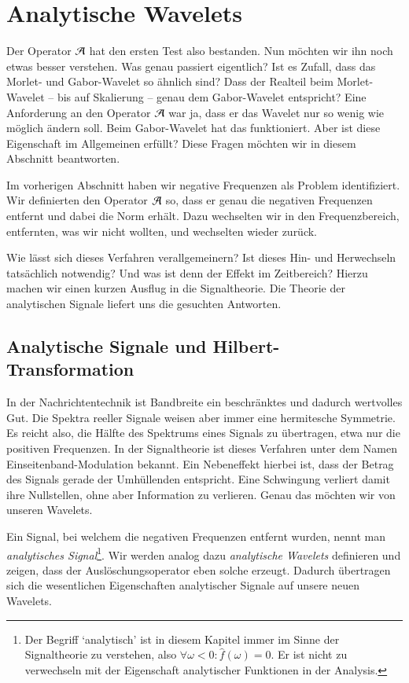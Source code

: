 \section{Analytische Wavelets}
Der Operator $\Ana\,$ hat den ersten Test also bestanden.
Nun möchten wir ihn noch etwas besser verstehen.
Was genau passiert eigentlich?
Ist es Zufall, dass das Morlet- und Gabor-Wavelet so ähnlich sind?
Dass der Realteil beim Morlet-Wavelet -- bis auf Skalierung -- genau dem Gabor-Wavelet entspricht?
Eine Anforderung an den Operator $\Ana\,$ war ja, dass er das Wavelet nur so wenig wie möglich ändern soll.
Beim Gabor-Wavelet hat das funktioniert.
Aber ist diese Eigenschaft im Allgemeinen erfüllt?
Diese Fragen möchten wir in diesem Abschnitt beantworten.

Im vorherigen Abschnitt haben wir negative Frequenzen als Problem identifiziert.
Wir definierten den Operator $\Ana\,$ so, dass er genau die negativen Frequenzen entfernt und dabei die Norm erhält.
Dazu wechselten wir in den Frequenzbereich, entfernten, was wir nicht wollten, und wechselten wieder zurück.

Wie lässt sich dieses Verfahren verallgemeinern? 
Ist dieses Hin- und Herwechseln tatsächlich notwendig?
Und was ist denn der Effekt im Zeitbereich?
Hierzu machen wir einen kurzen Ausflug in die Signaltheorie.
Die Theorie der analytischen Signale liefert uns die gesuchten Antworten.


\subsection{Analytische Signale und Hilbert-Transformation}
In der Nachrichtentechnik ist Bandbreite ein beschränktes und dadurch wertvolles Gut.
Die Spektra reeller Signale weisen aber immer eine hermitesche Symmetrie.
Es reicht also, die Hälfte des Spektrums eines Signals zu übertragen, etwa nur die positiven Frequenzen.
In der Signaltheorie ist dieses Verfahren unter dem Namen Einseitenband-Modulation bekannt.
Ein Nebeneffekt hierbei ist, dass der Betrag des Signals gerade der Umhüllenden entspricht.
Eine Schwingung verliert damit ihre Nullstellen, ohne aber Information zu verlieren.
Genau das möchten wir von unseren Wavelets.

Ein Signal, bei welchem die negativen Frequenzen entfernt wurden, nennt man \emph{analytisches Signal}\footnote{
	Der Begriff `analytisch' ist in diesem Kapitel immer im Sinne der Signaltheorie zu verstehen, also $\forall \omega < 0 \colon \hat f (\omega) = 0 $.
	Er ist nicht zu verwechseln mit der Eigenschaft analytischer Funktionen in der Analysis.
}.
Wir werden analog dazu \emph{analytische Wavelets} definieren und zeigen, dass der Auslöschungsoperator eben solche erzeugt.
Dadurch übertragen sich die wesentlichen Eigenschaften analytischer Signale auf unsere neuen Wavelets.

